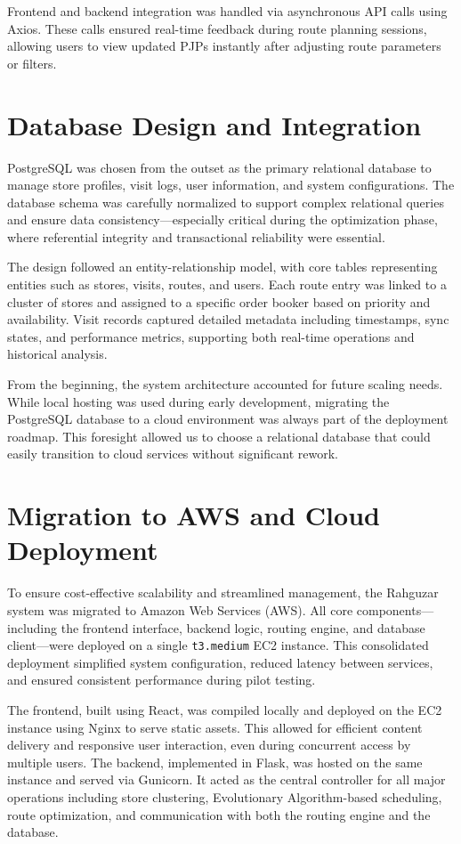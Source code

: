 Frontend and backend integration was handled via asynchronous API calls using Axios. These calls ensured real-time feedback during route planning sessions, allowing users to view updated PJPs instantly after adjusting route parameters or filters.

\section{Database Design and Integration}
PostgreSQL was chosen from the outset as the primary relational database to manage store profiles, visit logs, user information, and system configurations. The database schema was carefully normalized to support complex relational queries and ensure data consistency—especially critical during the optimization phase, where referential integrity and transactional reliability were essential.

The design followed an entity-relationship model, with core tables representing entities such as stores, visits, routes, and users. Each route entry was linked to a cluster of stores and assigned to a specific order booker based on priority and availability. Visit records captured detailed metadata including timestamps, sync states, and performance metrics, supporting both real-time operations and historical analysis.

From the beginning, the system architecture accounted for future scaling needs. While local hosting was used during early development, migrating the PostgreSQL database to a cloud environment was always part of the deployment roadmap. This foresight allowed us to choose a relational database that could easily transition to cloud services without significant rework.

\section{Migration to AWS and Cloud Deployment}

To ensure cost-effective scalability and streamlined management, the Rahguzar system was migrated to Amazon Web Services (AWS). All core components—including the frontend interface, backend logic, routing engine, and database client—were deployed on a single \texttt{t3.medium} EC2 instance. This consolidated deployment simplified system configuration, reduced latency between services, and ensured consistent performance during pilot testing.

The frontend, built using React, was compiled locally and deployed on the EC2 instance using Nginx to serve static assets. This allowed for efficient content delivery and responsive user interaction, even during concurrent access by multiple users. The backend, implemented in Flask, was hosted on the same instance and served via Gunicorn. It acted as the central controller for all major operations including store clustering, Evolutionary Algorithm-based scheduling, route optimization, and communication with both the routing engine and the database.

